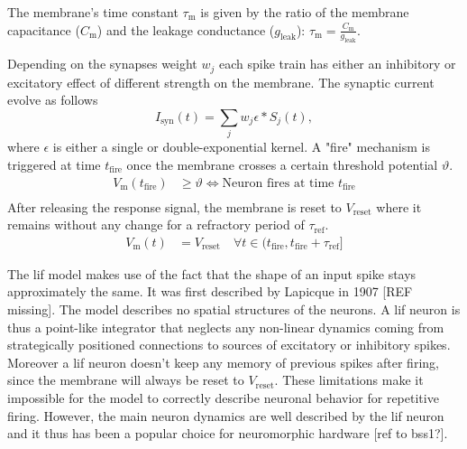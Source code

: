 The membrane's time constant $\tau_{\text{m}}$ is given by the ratio of the membrane capacitance ($C_{\text{m}}$) and the leakage conductance ($g_{\text{leak}}$): $\tau_{\text{m}} = \frac{C_{\text{m}}}{g_{\text{leak}}}$. 

Depending on the synapses weight $w_j$ each spike train has either an inhibitory or excitatory effect of different strength on the membrane. The synaptic current evolve as follows
\begin{equation}
I_{\text{syn}}(t) = \sum_j w_j \epsilon \ast S_j(t), 
\end{equation}
where $\epsilon$ is either a single or double-exponential kernel. %
A "fire" mechanism is triggered at time $t_{\text{fire}}$ once the membrane crosses a certain threshold potential $\mathcal{\vartheta}$. 
\begin{align}
V_{\text{m}}(t_{\text{fire}}) &\ge \vartheta \Leftrightarrow \text{Neuron fires at time } t_{\text{fire}} \\
\end{align}
After releasing the response signal, the membrane is reset to $V_{\text{reset}}$ where it remains without any change for a refractory period of $\tau_{\text{ref}}$. 
\begin{align}
V_{\text{m}}(t) &= V_{\text{reset}} \quad \forall t \in (t_{\text{fire}}, t_{\text{fire}} + \tau_{\text{ref}}] 
\end{align}


The \gls{lif} model makes use of the fact that the shape of an input spike stays approximately the same. It was first described by Lapicque in 1907 [REF missing]. The model describes no spatial structures of the neurons. A \gls{lif} neuron is thus a point-like integrator that neglects any non-linear dynamics coming from strategically positioned connections to sources of excitatory or inhibitory spikes. Moreover a \gls{lif} neuron doesn't keep any memory of previous spikes after firing, since the membrane will always be reset to $V_{\text{reset}}$. These limitations make it impossible for the model to correctly describe neuronal behavior for repetitive firing. However, the main neuron dynamics are well described by the \gls{lif} neuron and it thus has been a popular choice for neuromorphic hardware [ref to \gls{bss1}?].\\

